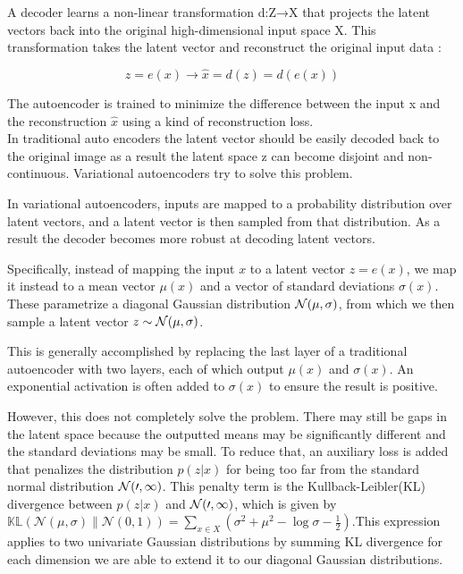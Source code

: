 A decoder learns a non-linear transformation d:Z→X that projects the latent vectors back into the original high-dimensional input space X. This transformation takes the latent vector and reconstruct the original input data : 

\begin{equation}
     z = e(x)  	\rightarrow  \hat{x}=d(z)=d(e(x))
\end{equation}

The autoencoder is trained to minimize the difference between the input x and the reconstruction $\hat{x}$ using a kind of reconstruction loss.\\ 

In traditional auto encoders the latent vector should be easily decoded back to the original image as a result the latent space z can become disjoint and non-continuous. Variational autoencoders try to solve this problem.

In variational autoencoders, inputs are mapped to a probability distribution over latent vectors, and a latent vector is then sampled from that distribution. As a result the decoder becomes more robust at decoding latent vectors.

Specifically, instead of mapping the input $x$ to a latent vector $z=e(x)$, 
we map it instead to a mean vector $\mu(x)$ 
and a vector of standard deviations $\sigma(x)$. 
These parametrize a diagonal Gaussian distribution $\cal{N}(\mu, \sigma)$, 
from which we then sample a latent vector $z \sim \cal{N}(\mu, \sigma)$.


This is generally accomplished by replacing the last layer of a traditional autoencoder with two layers, each of which output $\mu(x)$
and $\sigma(x)$. An exponential activation is often added to $\sigma(x)$ to ensure the result is positive.

However, this does not completely solve the problem. 
There may still be gaps in the latent space because the outputted means may 
be significantly different and the standard deviations may be small. 
To reduce that, an auxiliary loss is added that penalizes 
the distribution $p(z|x)$ for being too far from the standard normal distribution 
$\cal{N}(0,1)$. This penalty term is the 
Kullback-Leibler(KL) divergence between $p(z|x)$ and $\cal{N}(0,1)$, 
which is given by\(\mathbb{KL}\left( \mathcal{N}(\mu, \sigma) \parallel \mathcal{N}(0, 1) \right) = \sum_{x \in X} \left( \sigma^2 + \mu^2 - \log \sigma - \frac{1}{2} \right)\).This expression applies to two univariate Gaussian distributions by summing KL divergence for each dimension we are able to  extend it to our diagonal Gaussian distributions.

